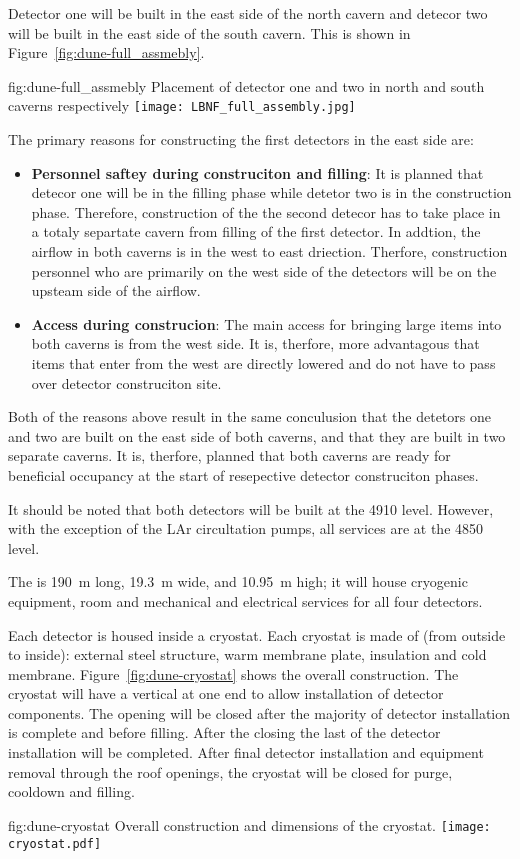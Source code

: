 Detector one will be built in the east side of the north cavern and
detecor two will be built in the east side of the south cavern. This
is shown in Figure~\ref{fig:dune-full_assmebly}.
\begin{dunefigure}{fig:dune-full_assmebly}
  {Placement of detector one and two in north and south caverns respectively}
  \texttt{[image: LBNF\_full\_assembly.jpg]}
\end{dunefigure}
The primary reasons for constructing the first detectors in the east side are:
\begin{itemize}
\item {\bf Personnel saftey during construciton and filling}: It is
  planned that detecor one will be in the filling phase while detetor
  two is in the construction phase. Therefore, construction of the the
  second detecor has to take place in a totaly separtate cavern from
  filling of the first detector. In addtion, the airflow in both
  caverns is in the west to east driection. Therfore, construction
  personnel who are primarily on the west side of the detectors will
  be on the upsteam side of the airflow.
\item{\bf Access during construcion}: The main access for bringing
  large items into both caverns is from the west side. It is,
  therfore, more advantagous that items that enter from the west are
  directly lowered and do not have to pass over detector construciton
  site.
\end{itemize}
Both of the reasons above result in the same conculusion that the
detetors one and two are built on the east side of both caverns, and
that they are built in two separate caverns. It is, therfore, planned
that both caverns are ready for beneficial occupancy at the start of
resepective detector construciton phases.

It should be noted that both detectors will be built at the 4910
level. However, with the exception of the LAr circultation pumps, all
services are at the 4850 level.

The  is \SI{190}{\meter} long, \SI{19.3}{\meter}
wide, and \SI{10.95}{\meter} high; it will house cryogenic equipment, 
room and mechanical and electrical services for all four
detectors.

Each detector is housed inside a cryostat. Each cryostat is made of
(from outside to inside): external steel structure, warm membrane
plate, insulation and cold membrane. Figure~\ref{fig:dune-cryostat}
shows the overall construction. The cryostat will have a vertical
 at one end to allow installation of detector components. The
opening will be closed after the majority of detector installation is
complete and before filling. After the  closing the last of the
detector installation will be completed. After final detector
installation and equipment removal through the roof openings, the
cryostat will be closed for purge, cooldown and filling.
\begin{dunefigure}{fig:dune-cryostat}
  {Overall construction and dimensions of the  cryostat.}
  \texttt{[image: cryostat.pdf]}
\end{dunefigure}


